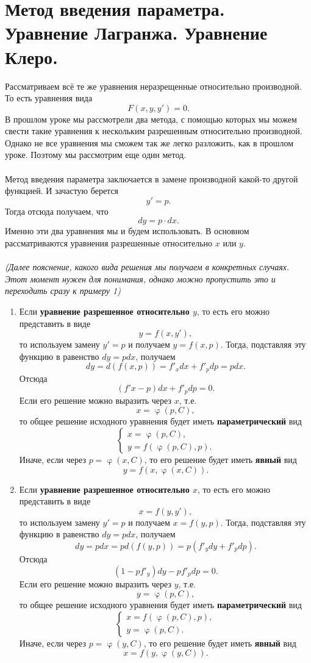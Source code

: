 \documentclass[a4paper, 12pt]{article}
\renewcommand{\varphi}{\upvarphi}
\renewcommand{\varphi}{\upvarphi}
\begin{document}
	\section*{Метод введения параметра. Уравнение Лагранжа. Уравнение Клеро.}
	Рассматриваем всё те же уравнения неразрещенные относительно производной. То есть уравнения вида $$F(x,y,y') = 0.$$
	В прошлом уроке мы рассмотрели два метода, с помощью которых мы можем свести такие уравнения к нескольким разрешенным относительно производной. Однако не все уравнения мы сможем так же легко разложить, как в прошлом уроке. Поэтому мы рассмотрим еще один метод.\\\\
	Метод введения параметра заключается в замене производной какой-то другой функцией. И зачастую берется $$y' = p.$$
	Тогда отсюда получаем, что $$dy = p\cdot dx.$$
	Именно эти два уравнения мы и будем использовать. В основном рассматриваются уравнения разрешенные относительно $x$ или $y$. \\\\\textit{(Далее пояснение, какого вида решения мы получаем в конкретных случаях. Этот момент нужен для понимания, однако можно пропустить это и переходить сразу к примеру 1)} \begin{enumerate}
		\item Если \textbf{уравнение разрешенное относительно $y$}, то есть его можно представить в виде $$y = f(x,y'),$$
		то используем замену $y' = p$ и получаем $y = f(x,p)$. Тогда, подставляя эту функцию в равенство $dy = pdx$, получаем $$dy = d(f(x,p)) = f'_xdx + f'_pdp = pdx.$$
		Отсюда $$(f'x - p)dx + f'_pdp = 0.$$
		Если его решение можно выразить через $x$, т.е. $$x = \varphi(p,C),$$
		то общее решение исходного уравнения будет иметь \textbf{параметрический} вид $$\begin{cases}
			x = \varphi(p,C),\\
			y = f(\varphi(p,C), p).
		\end{cases}$$
	Иначе, если через $p = \varphi(x, C)$, то его решение будет иметь \textbf{явный} вид $$y = f(x, \varphi(x,C)).$$
	\item Если \textbf{уравнение разрешенное относительно $x$}, то есть его можно представить в виде $$x = f(y,y'),$$
	то используем замену $y' = p$ и получаем $x = f(y,p)$. Тогда, подставляя эту функцию в равенство $dy = pdx$, получаем $$dy = pdx = pd(f(y,p)) = p(f'_ydy + f'_pdp).$$
	Отсюда $$(1 - pf'_y)dy - pf'_pdp = 0.$$
	Если его решение можно выразить через $y$, т.е. $$y = \varphi(p,C),$$
	то общее решение исходного уравнения будет иметь \textbf{параметрический} вид $$\begin{cases}
		x = f(\varphi(p,C), p),\\
		y = \varphi(p,C).
	\end{cases}$$
	Иначе, если через $p = \varphi(y, C)$, то его решение будет иметь \textbf{явный} вид $$x = f(y, \varphi(y,C)).$$
	\end{enumerate}
\end{document}
